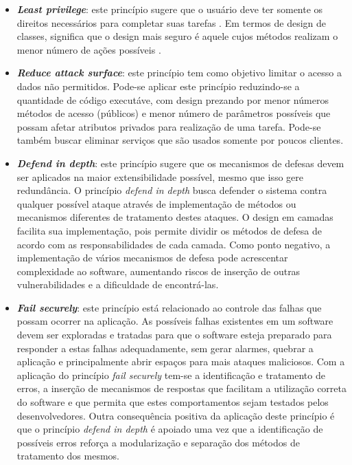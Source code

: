 \begin{itemize}
\item \textbf{\emph{Least privilege}}: este princípio sugere que o usuário deve ter somente os direitos necessários para completar suas tarefas \cite{bishop2003}. Em termos de design de classes, significa que o design mais seguro é aquele cujos métodos realizam o menor número de ações possíveis \cite{a1lshammari2009}.
\item \textbf{\emph{Reduce attack surface}}: este princípio tem como objetivo limitar o acesso a dados não permitidos. Pode-se aplicar este princípio reduzindo-se a quantidade de código executáve, com design prezando por menor números métodos de acesso (públicos) e menor número de parâmetros possíveis que possam afetar atributos privados para realização de uma tarefa. Pode-se também buscar eliminar serviços que são usados somente por poucos clientes.
\item \textbf{\emph{Defend in depth}}: este princípio sugere que os mecanismos de defesas devem ser aplicados na maior extensibilidade possível, mesmo que isso gere redundância. O princípio \emph{defend in depth} busca defender o sistema contra qualquer possível ataque através de implementação de métodos ou mecanismos diferentes de tratamento destes ataques. O design em camadas facilita sua implementação, pois permite dividir os métodos de defesa de acordo com as responsabilidades de cada camada. Como ponto negativo, a implementação de vários mecanismos de defesa pode acrescentar complexidade ao software, aumentando riscos de inserção de outras vulnerabilidades e a dificuldade de encontrá-las.
\item \textbf{\emph{Fail securely}}: este princípio está relacionado ao controle das falhas que possam ocorrer na aplicação. As possíveis falhas existentes em um software devem ser exploradas e tratadas para que o software esteja preparado para responder a estas falhas adequadamente, sem gerar alarmes, quebrar a aplicação e principalmente abrir espaços para mais ataques maliciosos. Com a aplicação do princípio \emph{fail securely} tem-se a identificação e tratamento de erros, a inserção de mecanismos de respostas que facilitam a utilização correta do software e que permita que estes comportamentos sejam testados pelos desenvolvedores. Outra consequência positiva da aplicação deste princípio é que o princípio \emph{defend in depth} é apoiado uma vez que a identificação de possíveis erros reforça a modularização e separação dos métodos de tratamento dos mesmos.

\end{itemize}
